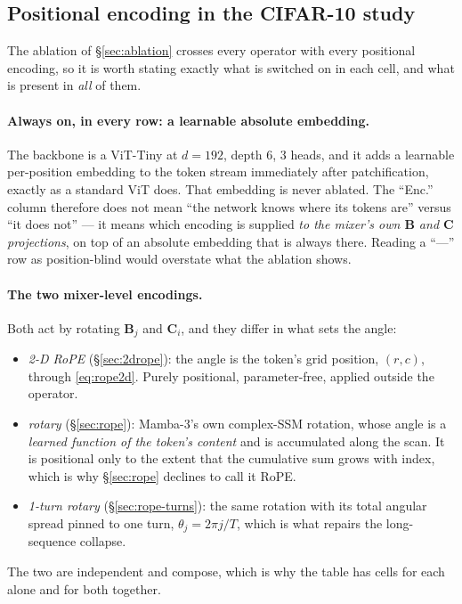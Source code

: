 \documentclass[11pt,a4paper]{article}
\begin{document}
\subsection{Positional encoding in the CIFAR-10 study}\label{sec:pos-cifar}

The ablation of \S\ref{sec:ablation} crosses every operator with every
positional encoding, so it is worth stating exactly what is switched on in each
cell, and what is present in \emph{all} of them.

\paragraph{Always on, in every row: a learnable absolute embedding.}
The backbone is a ViT-Tiny at $d{=}192$, depth $6$, $3$ heads, and it adds a
learnable per-position embedding to the token stream immediately after
patchification, exactly as a standard ViT does. That embedding is never ablated.
The ``Enc.'' column therefore does not mean ``the network knows where its tokens
are'' versus ``it does not'' --- it means which encoding is supplied
\emph{to the mixer's own $\bm{B}$ and $\bm{C}$ projections}, on top of an
absolute embedding that is always there. Reading a ``---'' row as position-blind
would overstate what the ablation shows.

\paragraph{The two mixer-level encodings.}
Both act by rotating $\bm{B}_j$ and $\bm{C}_i$, and they differ in what sets the
angle:
\begin{itemize}
  \item \emph{2-D RoPE} (\S\ref{sec:2drope}): the angle is the token's grid
        position, $(r,c)$, through \eqref{eq:rope2d}. Purely positional,
        parameter-free, applied outside the operator.
  \item \emph{rotary} (\S\ref{sec:rope}): Mamba-3's own complex-SSM rotation,
        whose angle is a \emph{learned function of the token's content} and is
        accumulated along the scan. It is positional only to the extent that the
        cumulative sum grows with index, which is why \S\ref{sec:rope} declines
        to call it RoPE.
  \item \emph{1-turn rotary} (\S\ref{sec:rope-turns}): the same rotation with
        its total angular spread pinned to one turn, $\theta_j = 2\pi j/T$,
        which is what repairs the long-sequence collapse.
\end{itemize}
The two are independent and compose, which is why the table has cells for each
alone and for both together.
\end{document}
